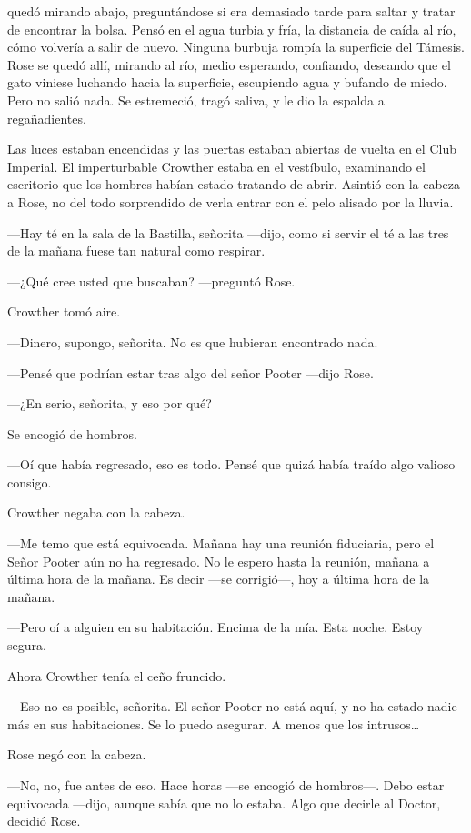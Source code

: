 {quedó mirando abajo, preguntándose si era demasiado tarde para saltar y
	tratar de encontrar la bolsa. Pensó en el agua turbia y fría, la
	distancia de caída al río, cómo volvería a salir de nuevo. Ninguna
	burbuja rompía la superficie del Támesis. Rose se quedó allí, mirando al
	río, medio esperando, confiando, deseando que el gato viniese luchando
	hacia la superficie, escupiendo agua y bufando de miedo. Pero no salió
nada. Se estremeció, tragó saliva, y le dio la espalda a regañadientes.}

{Las luces estaban encendidas y las puertas estaban abiertas de vuelta
	en el Club Imperial. El imperturbable Crowther estaba en el vestíbulo,
	examinando el escritorio que los hombres habían estado tratando de
	abrir. Asintió con la cabeza a Rose, no del todo sorprendido de verla
entrar con el pelo alisado por la lluvia.}

{---Hay té en la sala de la Bastilla, señorita ---dijo, como si servir
el té a las tres de la mañana fuese tan natural como respirar.}

{---¿Qué cree usted que buscaban? ---preguntó Rose.}

{Crowther tomó aire.}

{---Dinero, supongo, señorita. No es que hubieran encontrado nada.}

{---Pensé que podrían estar tras algo del señor Pooter ---dijo Rose.}

{---¿En serio, señorita, y eso por qué?}

{Se encogió de hombros.}

{---Oí que había regresado, eso es todo. Pensé que quizá había traído
algo valioso consigo.}

{Crowther negaba con la cabeza.}

{---Me temo que está equivocada. Mañana hay una reunión fiduciaria, pero
	el Señor Pooter aún no ha regresado. No le espero hasta la reunión,
	mañana a última hora de la mañana. Es decir ---se corrigió---, hoy a
última hora de la mañana.}

{---Pero oí a alguien en su habitación. Encima de la mía. Esta noche.
Estoy segura.}

{Ahora Crowther tenía el ceño fruncido.}

{---Eso no es posible, señorita. El señor Pooter no está aquí, y no ha
	estado nadie más en sus habitaciones. Se lo puedo asegurar. A menos que
	los intrusos\ldots{}}

{Rose negó con la cabeza.}

{---No, no, fue antes de eso. Hace horas ---se encogió de hombros---.
	Debo estar equivocada ---dijo, aunque sabía que no lo estaba. Algo que
decirle al Doctor, decidió Rose.}

